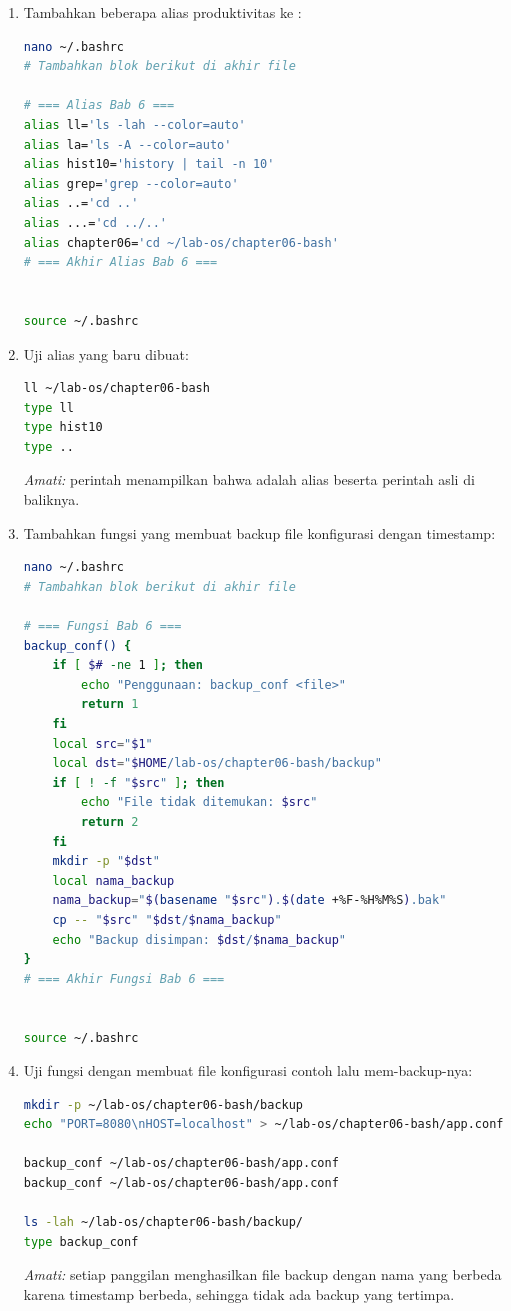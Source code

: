 \begin{enumerate}
    \item Tambahkan beberapa alias produktivitas ke :
\begin{lstlisting}[language=bash, caption={Menambahkan alias ke .bashrc}]
nano ~/.bashrc
# Tambahkan blok berikut di akhir file

# === Alias Bab 6 ===
alias ll='ls -lah --color=auto'
alias la='ls -A --color=auto'
alias hist10='history | tail -n 10'
alias grep='grep --color=auto'
alias ..='cd ..'
alias ...='cd ../..'
alias chapter06='cd ~/lab-os/chapter06-bash'
# === Akhir Alias Bab 6 ===


source ~/.bashrc
\end{lstlisting}

    \item Uji alias yang baru dibuat:
\begin{lstlisting}[language=bash, caption={Menguji alias}]
ll ~/lab-os/chapter06-bash
type ll
type hist10
type ..
\end{lstlisting}
    \textit{Amati:} perintah  menampilkan bahwa  adalah
    alias beserta perintah asli di baliknya.

    \item Tambahkan fungsi  yang membuat backup file
          konfigurasi dengan timestamp:
\begin{lstlisting}[language=bash, caption={Menambahkan fungsi backup\_conf ke .bashrc}]
nano ~/.bashrc
# Tambahkan blok berikut di akhir file

# === Fungsi Bab 6 ===
backup_conf() {
    if [ $# -ne 1 ]; then
        echo "Penggunaan: backup_conf <file>"
        return 1
    fi
    local src="$1"
    local dst="$HOME/lab-os/chapter06-bash/backup"
    if [ ! -f "$src" ]; then
        echo "File tidak ditemukan: $src"
        return 2
    fi
    mkdir -p "$dst"
    local nama_backup
    nama_backup="$(basename "$src").$(date +%F-%H%M%S).bak"
    cp -- "$src" "$dst/$nama_backup"
    echo "Backup disimpan: $dst/$nama_backup"
}
# === Akhir Fungsi Bab 6 ===


source ~/.bashrc
\end{lstlisting}

    \item Uji fungsi dengan membuat file konfigurasi contoh lalu
          mem-backup-nya:
\begin{lstlisting}[language=bash, caption={Menguji fungsi backup\_conf}]
mkdir -p ~/lab-os/chapter06-bash/backup
echo "PORT=8080\nHOST=localhost" > ~/lab-os/chapter06-bash/app.conf

backup_conf ~/lab-os/chapter06-bash/app.conf
backup_conf ~/lab-os/chapter06-bash/app.conf

ls -lah ~/lab-os/chapter06-bash/backup/
type backup_conf
\end{lstlisting}
    \textit{Amati:} setiap panggilan  menghasilkan file
    backup dengan nama yang berbeda karena timestamp berbeda, sehingga tidak
    ada backup yang tertimpa.
\end{enumerate}

